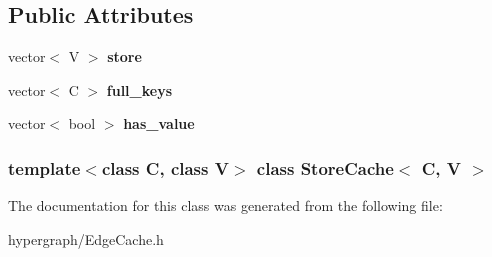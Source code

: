 \subsection*{Public Attributes}
\begin{DoxyCompactItemize}
\item 
\hypertarget{classStoreCache_a99393733357e04fe79cf703d3f4d8f44}{
vector$<$ V $>$ {\bfseries store}}
\label{classStoreCache_a99393733357e04fe79cf703d3f4d8f44}

\item 
\hypertarget{classStoreCache_a0df08d5576ce34c4a8fd4f7428fd9ad3}{
vector$<$ C $>$ {\bfseries full\_\-keys}}
\label{classStoreCache_a0df08d5576ce34c4a8fd4f7428fd9ad3}

\item 
\hypertarget{classStoreCache_acdfad2c43fd63e37fbb818ce282f6493}{
vector$<$ bool $>$ {\bfseries has\_\-value}}
\label{classStoreCache_acdfad2c43fd63e37fbb818ce282f6493}

\end{DoxyCompactItemize}
\subsubsection*{template$<$class C, class V$>$ class StoreCache$<$ C, V $>$}



The documentation for this class was generated from the following file:\begin{DoxyCompactItemize}
\item 
hypergraph/EdgeCache.h\end{DoxyCompactItemize}
